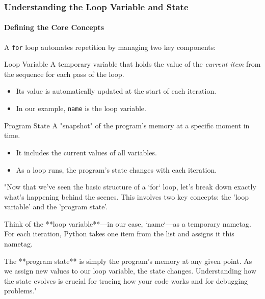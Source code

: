 \documentclass{beamer}
\begin{document}
\begin{frame}[fragile]
    \frametitle{Understanding the Loop Variable and State}
    \framesubtitle{Defining the Core Concepts}

    A \texttt{for} loop automates repetition by managing two key components:

    \begin{block}{Loop Variable}
        A temporary variable that holds the value of the \textit{current item} from the sequence for each pass of the loop.
        \begin{itemize}
            \item Its value is automatically updated at the start of each iteration.
            \item In our example, \texttt{name} is the loop variable.
        \end{itemize}
    \end{block}

    \begin{block}{Program State}
        A "snapshot" of the program's memory at a specific moment in time.
        \begin{itemize}
            \item It includes the current values of all variables.
            \item As a loop runs, the program's state changes with each iteration.
        \end{itemize}
    \end{block}

    \begin{note}
    "Now that we've seen the basic structure of a `for` loop, let's break down exactly what's happening behind the scenes. This involves two key concepts: the 'loop variable' and the 'program state'.

    Think of the **loop variable**—in our case, `name`—as a temporary nametag. For each iteration, Python takes one item from the list and assigns it this nametag.

    The **program state** is simply the program's memory at any given point. As we assign new values to our loop variable, the state changes. Understanding how the state evolves is crucial for tracing how your code works and for debugging problems."
    \end{note}
\end{frame}
\end{document}
